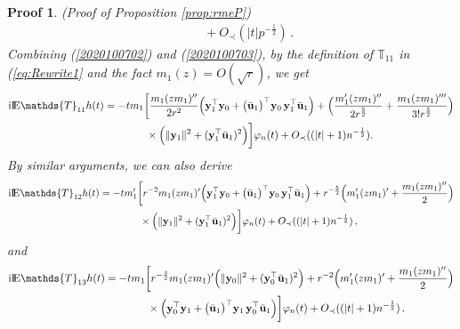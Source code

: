 \documentclass[12pt]{article}
\numberwithin{equation}{section}
\newtheorem{myPro}{Proof}
\theoremstyle{remark}
\newcommand{\1}{{\rm 1}\kern-0.24em{\rm I}}
\newcommand{\E}{{\rm I}\kern-0.18em{\rm E}}
\begin{document}
\begin{appendices}
\begin{myPro}{(Proof of Proposition  \ref{prop:rmeP})}
{\begin{align}
&\qquad + O_\prec(|t|p^{-\frac 12}) \,.
 \end{align}
 }
Combining (\ref{2020100702}) and (\ref{2020100703}), by the definition of $\mathds{T}_{11}$ in (\ref{eq:Rewrite1} and the fact $m_1(z)= O(\sqrt r)$, we get 
\begin{align}\label{est:ET11P}
\mathrm{i}\E \mathds{T}_{11}h(t)&=-t m_1 \bigg[ \frac{m_1(zm_1)''}{2r^2} \Big( {\bf y}_1^{\top}{\bf y}_{0} + \big(\bar{\bf u}_1\big)^{\top}{\bf y}_{0} \,{\bf y}_1^{\top}\bar{\bf u}_1 \Big) + \Big( \frac{m_1'(zm_1)''}{2r^{\frac 52}} + \frac{m_1(zm_1)'''}{3!r^{\frac 52}}\Big)\notag\\
&\qquad \qquad \times \Big(\Vert{\bf y}_{1} \Vert^2+ ({\bf y}_1^{\top}\bar{\bf u}_1)^2\Big) \bigg]\varphi_n(t)+ O_\prec((|t|+1)n^{-\frac 12}).
\end{align}
By similar arguments, we can also derive 
\begin{align}\label{est:ET12P}
{\mathrm{i}} \E \mathds{T}_{12}h(t)
&=- t m_1' \bigg[ r^{-2}{m_1(zm_1)'} \Big( {\bf y}_1^{\top}{\bf y}_{0} + \big(\bar{\bf u}_1\big)^{\top} {\bf y}_{0} \,{\bf y}_1^{\top}\bar{\bf u}_1 \Big) + r^{-\frac 52}\Big( {m_1'(zm_1)'} + \frac{m_1(zm_1)''}{2}\Big)\notag\\
&\qquad \qquad \times \Big( \Vert{\bf y}_{1} \Vert^2+ ({\bf y}_1^{\top}\bar{\bf u}_1)^2 \Big) \bigg]\varphi_n(t)+ O_\prec((|t|+1)n^{-\frac 12})\,,
\end{align}
and 
\begin{align}\label{est:ET13P}
\mathrm{i}\E \mathds{T}_{13}h(t)&=-t m_1 \bigg[ r^{-\frac 32}{m_1(zm_1)'} \Big( \Vert{\bf y}_{0}\Vert^2 +({\bf y}_0^{\top}\bar{\bf u}_1)^2 \Big) + r^{-2}\Big( {m_1'(zm_1)'} + \frac{m_1(zm_1)''}{2}\Big)\notag\\
&\qquad \qquad \times \Big( {\bf y}_0^{\top}{\bf y}_{1} + \big(\bar{\bf u}_1\big)^{\top} {\bf y}_{1} \,{\bf y}_0^{\top}\bar{\bf u}_1 \Big) \bigg]\varphi_n(t)+ O_\prec((|t|+1)n^{-\frac 12})\,.
\end{align}



\end{myPro}
\end{appendices}
\end{document}
